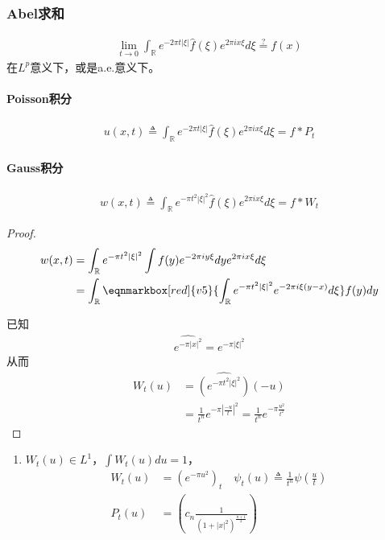 \subsubsection{Abel求和}
\begin{align*}
    \lim\limits_{t\to 0} \int_{\mathbb{R}} e^{-2\pi t |\xi|} \widehat{f}(\xi) e^{2\pi i x \xi} d\xi \overset{?}{=} f(x)
\end{align*}
在$L^p$意义下，或是a.e.意义下。

\paragraph{Poisson积分}
\begin{align*}
    u(x,t) \triangleq \int_{\mathbb{R}} e^{-2\pi t |\xi|} \widehat{f}(\xi) e^{2\pi i x \xi} d\xi = f*P_t
\end{align*}

\paragraph{Gauss积分}
\begin{align*}
    w(x,t) \triangleq \int_{\mathbb{R}} e^{-\pi t^2 |\xi|^2} \widehat{f}(\xi) e^{2\pi i x \xi} d\xi = f * W_t
\end{align*}

\begin{proof}
    \begin{align*}
        w(x,t) & = \int_{\mathbb{R}} e^{-\pi t^2 |\xi|^2} \int f(y) e^{-2\pi i y \xi} dy e^{2\pi i x \xi} d\xi \\
        & = \int_{\mathbb{R}} \eqnmarkbox[red]{v5}{\int_{\mathbb{R}} e^{-\pi t^2 |\xi|^2} e^{-2\pi i \xi(y-x)} d\xi} f(y) dy
    \end{align*}

    已知
    \begin{align*}
        \widehat{e^{-\pi |x|^2}} = e^{-\pi |\xi|^2}
    \end{align*}
    从而
    \begin{align*}
        W_t(u) & = \widehat{\left(e^{-\pi t^2 |\xi|^2} \right)} (-u) \\
        & = \frac{1}{t^n} e^{-\pi \left|\frac{-u}{t}\right|^2} = \frac{1}{t^n} e^{-\pi \frac{u^2}{t^2}}
    \end{align*}
\end{proof}

\begin{enumerate}[leftmargin=1cm, label=\arabic*]
    \item $W_t(u)\in L^1$，$\int W_t(u) du =1$，
    \begin{align*}
        W_t(u) &= (e^{-\pi u^2})_t \quad \psi_t(u) \triangleq \frac{1}{t^n} \psi(\frac{u}{t}) \\
        P_t(u) &= \left(c_n \frac{1}{(1+|x|^2)^{\frac{n+1}{2}}} \right)
    \end{align*}
\end{enumerate}



